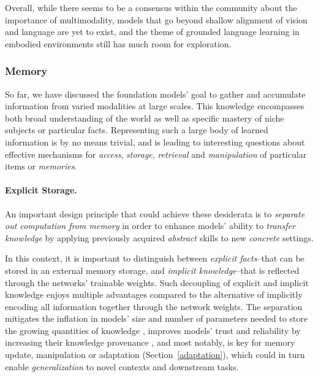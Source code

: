Overall, while there seems to be a consensus within the community about the importance of multimodality, models that go beyond shallow alignment of vision and language are yet to exist, and the theme of grounded language learning in embodied environments still has much room for exploration.

\subsubsection{Memory} 
\label{sec:modeling-memory}
So far, we have discussed the  foundation models' goal to gather and accumulate information from varied modalities at large scales. This knowledge encompasses both broad understanding of the world as well as specific mastery of niche subjects or particular facts. Representing such a large body of learned information is by no means trivial, and is leading to interesting questions about effective mechanisms for \textit{access}, \textit{storage}, \textit{retrieval} and \textit{manipulation} of particular items or \textit{memories}.

\paragraph{Explicit Storage.} An important design principle that could achieve these desiderata is to \textit{separate out \textit{computation} from \textit{memory}} \citep{Weston2015MemoryN,dnc,mac,nsm} in order to enhance models' ability to \textit{transfer knowledge} by applying previously acquired \textit{abstract} skills to new \textit{concrete} settings. 

In this context, it is important to distinguish between \textit{explicit facts}--that can be stored in an external memory storage, and \textit{implicit knowledge}--that is reflected through the networks' trainable weights. Such decoupling of explicit and implicit knowledge enjoys multiple advantages compared to the alternative of implicitly encoding all information together through the network weights. The separation mitigates the inflation in models' size and number of parameters needed to store the growing quantities of knowledge \citep{guu2020realm}, improves models' trust and reliability by increasing their knowledge provenance \citep{cheney2009provenance}, and most notably, is key for memory update, manipulation or adaptation \citep{lewis2020retrieval} (Section~\ref{adaptation}), which could in turn enable \textit{generalization} to novel contexts and downstream tasks. 

